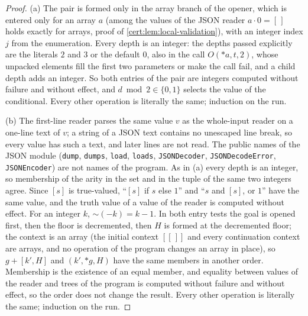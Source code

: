 \begin{proof}
(a) The pair is formed only in the array branch of the opener, which is entered only for an array
$a$ (among the values of the JSON reader $a\cdot 0=[\,]$ holds exactly for arrays, proof of
\cref{cert:lem:local-validation}), with an integer index $j$ from the enumeration. Every depth is
an integer: the depths passed explicitly are the literals $2$ and $3$ or the default $0$, also in
the call $O({*}a,t,2)$, whose unpacked elements fill the first two parameters or make the call
fail, and a child depth adds an integer. So both entries of the pair are integers computed
without failure and without effect, and $d\bmod 2\in\{0,1\}$ selects the value of the
conditional. Every other operation is literally the same; induction on the run.

(b) The first-line reader parses the same value $v$ as the whole-input reader on a one-line text
of $v$; a string of a JSON text contains no unescaped line break, so every value has such a text,
and later lines are not read. The public names of the JSON module (\texttt{dump}, \texttt{dumps},
\texttt{load}, \texttt{loads}, \texttt{JSONDecoder}, \texttt{JSONDecodeError},
\texttt{JSONEncoder}) are not names of the program. As in (a) every depth is an integer, so
membership of the arity in the set and in the tuple of the same two integers agree. Since $[s]$ is
true-valued, ``$[s]$ if $s$ else $1$'' and ``$s$ and $[s]$, or $1$'' have the same value, and the
truth value of a value of the reader is computed without effect. For an integer $k$,
$\mathord{\sim}(-k)=k-1$. In both entry tests the goal is opened first, then the floor is
decremented, then $H$ is formed at the decremented floor; the context is an array (the initial
context $[[\,]]$ and every continuation context are arrays, and no operation of the program changes
an array in place), so $g+[k',H]$ and $(k',{*}g,H)$ have the same members in another order.
Membership is the existence of an equal member, and equality between values of the reader and
trees of the program is computed without failure and without effect, so the order does not change
the result. Every other operation is literally the same; induction on the run.


\end{proof}
